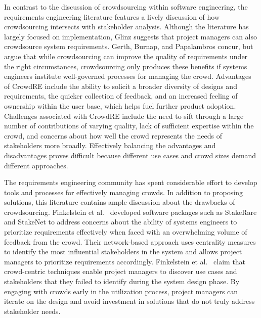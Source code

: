 In contrast to the discussion of crowdsourcing within software engineering, the requirements engineering literature features a lively discussion of how crowdsourcing intersects with stakeholder analysis. Although the literature has largely focused on implementation, Glinz \cite{glinz} suggests that project managers can also crowdsource system requirements. Gerth, Burnap, and Papalambros \cite{gerth} concur, but argue that while crowdsourcing can improve the quality of requirements under the right circumstances, crowdsourcing only produces these benefits if systems engineers institute well-governed processes for managing the crowd. Advantages of CrowdRE include the ability to solicit a broader diversity of designs and requirements, the quicker collection of feedback, and an increased feeling of ownership within the user base, which helps fuel further product adoption. Challenges associated with CrowdRE include the need to sift through a large number of contributions of varying quality, lack of sufficient expertise within the crowd, and concerns about how well the crowd represents the needs of stakeholders more broadly. Effectively balancing the advantages and disadvantages proves difficult because different use cases and crowd sizes demand different approaches.

The requirements engineering community has spent considerable effort to develop tools and processes for effectively managing crowds. In addition to proposing solutions, this literature contains ample discussion about the drawbacks of crowdsourcing. Finkelstein et al.~\cite{stakenet, stakerare, lim} developed software packages such as StakeRare and StakeNet to address concerns about the ability of systems engineers to prioritize requirements effectively when faced with an overwhelming volume of feedback from the crowd. Their network-based approach uses centrality measures to identify the most influential stakeholders in the system and allows project managers to prioritize requirements accordingly. Finkelstein et al.~\cite{stakenet, stakerare, lim} claim that crowd-centric techniques enable project managers to discover use cases and stakeholders that they failed to identify during the system design phase. By engaging with crowds early in the utilization process, project managers can iterate on the design and avoid investment in solutions that do not truly address stakeholder needs.

